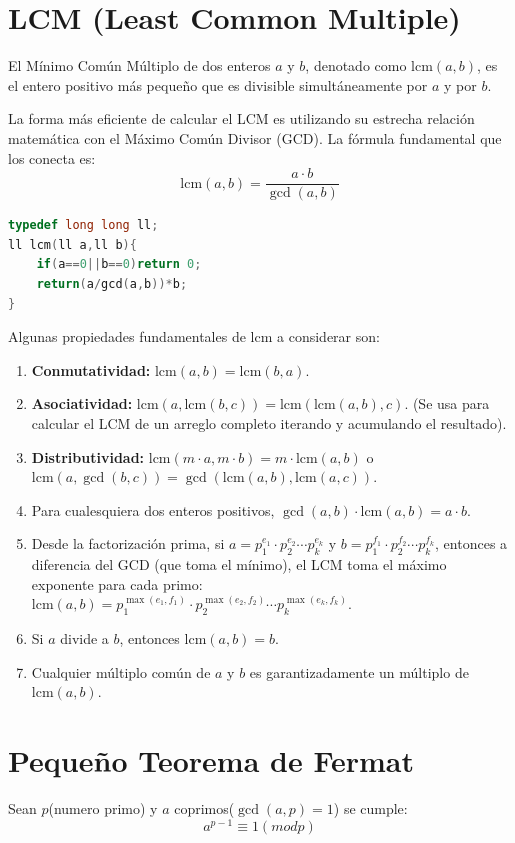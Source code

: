 \documentclass{article}
\begin{document}
\section*{LCM (Least Common Multiple)}
El Mínimo Común Múltiplo de dos enteros $a$ y $b$, denotado como $\text{lcm}(a,b)$, es el entero positivo más pequeño que es divisible simultáneamente por $a$ y por $b$.\par
La forma más eficiente de calcular el LCM es utilizando su estrecha relación matemática con el Máximo Común Divisor (GCD). La fórmula fundamental que los conecta es:
\begin{equation}
    \text{lcm}(a,b) = \frac{a \cdot b}{\gcd(a,b)}
\end{equation}
\begin{lstlisting}[language=C++]
typedef long long ll;
ll lcm(ll a,ll b){
    if(a==0||b==0)return 0;
    return(a/gcd(a,b))*b;
}
\end{lstlisting}
Algunas propiedades fundamentales de $\text{lcm}$ a considerar son:\par
\begin{enumerate}
    \item \textbf{Conmutatividad:} $\text{lcm}(a,b) = \text{lcm}(b,a)$.
    \item \textbf{Asociatividad:} $\text{lcm}(a,\text{lcm}(b,c)) = \text{lcm}(\text{lcm}(a,b),c)$. (Se usa para calcular el LCM de un arreglo completo iterando y acumulando el resultado).
    \item \textbf{Distributividad:} $\text{lcm}(m \cdot a, m \cdot b) = m \cdot \text{lcm}(a,b)$ o $\text{lcm}(a,\gcd(b,c))=\gcd(\text{lcm}(a,b),\text{lcm}(a,c))$.
    \item Para cualesquiera dos enteros positivos, $\gcd(a,b) \cdot \text{lcm}(a,b) = a \cdot b$.
    \item Desde la factorización prima, si $a = p_1^{e_1} \cdot p_2^{e_2} \cdots p_k^{e_k}$ y $b = p_1^{f_1} \cdot p_2^{f_2} \cdots p_k^{f_k}$, entonces a diferencia del GCD (que toma el mínimo), el LCM toma el máximo exponente para cada primo: \\ $\text{lcm}(a,b) = p_1^{\max(e_1,f_1)} \cdot p_2^{\max(e_2,f_2)} \cdots p_k^{\max(e_k,f_k)}$.
    \item Si $a$ divide a $b$, entonces $\text{lcm}(a,b) = b$.
    \item Cualquier múltiplo común de $a$ y $b$ es garantizadamente un múltiplo de $\text{lcm}(a,b)$.
\end{enumerate}
\section*{Pequeño Teorema de Fermat}
Sean $p$(numero primo) y $a$ coprimos($\gcd(a,p)=1$) se cumple:
\begin{equation}
    a^{p-1}\equiv 1 (mod p)
\end{equation}
\end{document}
